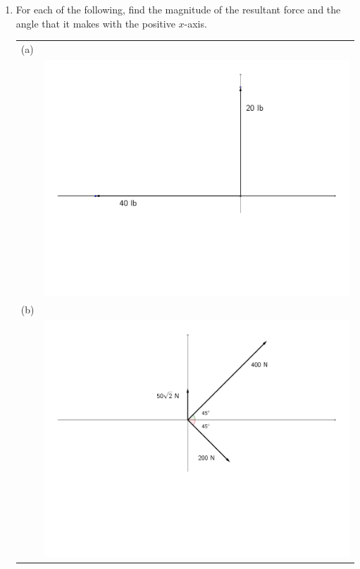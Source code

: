 \documentclass[12pt]{article}
\newif\ifans
\begin{document}
\begin{enumerate}
\ifans{\fbox{$\left \langle \frac{\sqrt{2}+\sqrt{3}}{2},\frac{\sqrt{2}-1}{2}\right \rangle$}} \fi

\item For each of the following, find the magnitude of the resultant force and the angle that it makes with the positive $x$-axis.

\begin{tabular}{ll}
(a) & \\
 & \includegraphics[scale=0.4]{vector7.pdf}\\
(b) & \\
 & \includegraphics[scale=0.4]{vector8.pdf}\\
\end{tabular}


\end{enumerate}
\end{document}
